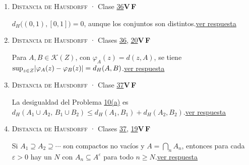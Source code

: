 \documentclass[11pt,a4paper]{article}
\begin{document}
\begin{enumerate}[leftmargin=2.2em,itemsep=8pt,label=\textbf{\arabic*.}]
\item[\hyperlink{r-9}{\textbf{9.}}] \hypertarget{q-9}{}{\small \textsc{Distancia de Hausdorff} · Clase \href{https://decostruttivismo.github.io/MAT2514-repaso/pdf/MAT2514_apuntes_completos.pdf\#nameddest=section.36}{36}}\hfill \textbf{V}\,\fbox{\rule{0pt}{6pt}\hspace{6pt}}\quad\textbf{F}\,\fbox{\rule{0pt}{6pt}\hspace{6pt}}\par $d_H\bigl((0,1),[0,1]\bigr)=0$, aunque los conjuntos son distintos.\hfill{\footnotesize\hyperlink{r-9}{ver respuesta}}
\item[\hyperlink{r-10}{\textbf{10.}}] \hypertarget{q-10}{}{\small \textsc{Distancia de Hausdorff} · Clases \href{https://decostruttivismo.github.io/MAT2514-repaso/pdf/MAT2514_apuntes_completos.pdf\#nameddest=section.36}{36}, \href{https://decostruttivismo.github.io/MAT2514-repaso/pdf/MAT2514_apuntes_completos.pdf\#nameddest=section.20}{20}}\hfill \textbf{V}\,\fbox{\rule{0pt}{6pt}\hspace{6pt}}\quad\textbf{F}\,\fbox{\rule{0pt}{6pt}\hspace{6pt}}\par Para $A,B\in\mathcal K(Z)$, con $\varphi_A(z)=d(z,A)$, se tiene $\sup_{z\in Z}\lvert \varphi_A(z)-\varphi_B(z)\rvert=d_H(A,B)$.\hfill{\footnotesize\hyperlink{r-10}{ver respuesta}}
\item[\hyperlink{r-11}{\textbf{11.}}] \hypertarget{q-11}{}{\small \textsc{Distancia de Hausdorff} · Clase \href{https://decostruttivismo.github.io/MAT2514-repaso/pdf/MAT2514_apuntes_completos.pdf\#nameddest=section.37}{37}}\hfill \textbf{V}\,\fbox{\rule{0pt}{6pt}\hspace{6pt}}\quad\textbf{F}\,\fbox{\rule{0pt}{6pt}\hspace{6pt}}\par La desigualdad del Problema \hyperlink{prob-10}{10(a)} es $d_H(A_1\cup A_2,\,B_1\cup B_2)\le d_H(A_1,B_1)+d_H(A_2,B_2)$.\hfill{\footnotesize\hyperlink{r-11}{ver respuesta}}
\item[\hyperlink{r-12}{\textbf{12.}}] \hypertarget{q-12}{}{\small \textsc{Distancia de Hausdorff} · Clases \href{https://decostruttivismo.github.io/MAT2514-repaso/pdf/MAT2514_apuntes_completos.pdf\#nameddest=section.37}{37}, \href{https://decostruttivismo.github.io/MAT2514-repaso/pdf/MAT2514_apuntes_completos.pdf\#nameddest=section.19}{19}}\hfill \textbf{V}\,\fbox{\rule{0pt}{6pt}\hspace{6pt}}\quad\textbf{F}\,\fbox{\rule{0pt}{6pt}\hspace{6pt}}\par Si $A_1\supseteq A_2\supseteq\cdots$ son compactos no vacíos y $A=\bigcap_nA_n$, entonces para cada $\varepsilon\gt 0$ hay un $N$ con $A_n\subseteq A^\varepsilon$ para todo $n\ge N$.\hfill{\footnotesize\hyperlink{r-12}{ver respuesta}}

\end{enumerate}
\end{document}
